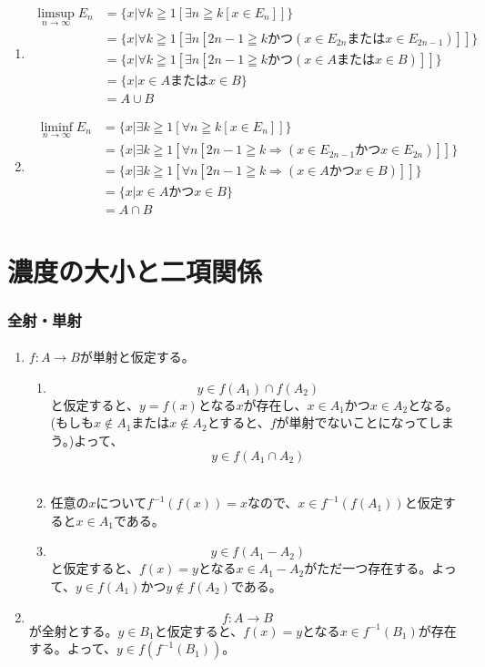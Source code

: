 \documentclass{jsarticle}
\begin{document}
\subsection{}
\begin{enumerate}
\item
\begin{align*}
\limsup_{n\to\infty}E_{n}&=\{x|\forall k\geqq 1[\exists n \geqq k[x\in E_{n}]]\}\\
&=\{x|\forall k\geqq 1[\exists n[2n-1 \geqq k かつ (x\in E_{2n} または x\in E_{2n-1})]]\}\\
&=\{x|\forall k\geqq 1[\exists n [2n-1 \geqq k かつ (x \in A または x\in B)]]\}\\
&=\{x|x\in A または x\in B\}\\
&=A\cup B
\end{align*}
\item
\begin{align*}
\liminf_{n\to\infty}E_{n}&=\{x|\exists k\geqq 1[\forall n \geqq k[x\in E_{n}]]\}\\
&=\{x|\exists k\geqq 1[\forall n [2n-1\geqq k \Longrightarrow (x\in E_{2n-1}かつx\in E_{2n})]]\}\\
&=\{x|\exists k\geqq 1[\forall n [2n-1\geqq k \Longrightarrow (x\in A かつx\in B)]]\}\\
&=\{x|x\in A かつx\in B\}\\
&=A\cap B
\end{align*}
\end{enumerate}



\part{濃度の大小と二項関係}
\section{全射・単射}
\subsection{}
\begin{enumerate}
\item
$f:A\to B$が単射と仮定する。
\begin{enumerate}
\item
\[y\in f(A_1)\cap f(A_2)\]
と仮定すると、$y=f(x)$となる$x$が存在し、$x\in A_1$かつ$x\in A_2$となる。(もしも$x\notin A_1$または$x\notin A_2$とすると、$f$が単射でないことになってしまう。)よって、
\[y\in f(A_1 \cap A_2)\]\\
\item
任意の$x$について$f^{-1}(f(x))=x$なので、$x\in f^{-1}(f(A_1))$と仮定すると$x\in A_1$である。\\
\item
\[y\in f(A_1 - A_2)\]
と仮定すると、$f(x)=y$となる$x\in A_1 - A_2$がただ一つ存在する。よって、$y\in f(A_1)$かつ$y\notin f(A_2)$である。
\end{enumerate}
\item
\[f:A\to B\]
が全射とする。$y\in B_1$と仮定すると、$f(x)=y$となる$x\in f^{-1}(B_1)$が存在する。よって、$y\in f(f^{-1}(B_1))$。
\end{enumerate}
\end{document}
